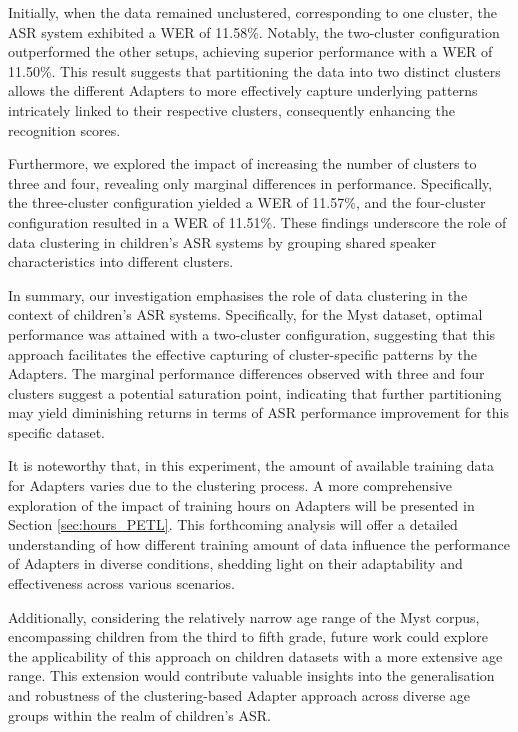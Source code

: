 Initially, when the data remained unclustered, corresponding to one cluster, the \ac{ASR} system exhibited a \ac{WER} of 11.58\%. Notably, the two-cluster configuration outperformed the other setups, achieving superior performance with a \ac{WER} of 11.50\%. This result suggests that partitioning the data into two distinct clusters allows the different Adapters to more effectively capture underlying patterns intricately linked to their respective clusters, consequently enhancing the recognition scores.

Furthermore, we explored the impact of increasing the number of clusters to three and four, revealing only marginal differences in performance. Specifically, the three-cluster configuration yielded a \ac{WER} of 11.57\%, and the four-cluster configuration resulted in a \ac{WER} of 11.51\%. These findings underscore the role of data clustering in children's \ac{ASR} systems by grouping shared speaker characteristics into different clusters.


In summary, our investigation emphasises the role of data clustering in the context of children's \ac{ASR} systems. Specifically, for the Myst dataset, optimal performance was attained with a two-cluster configuration, suggesting that this approach facilitates the effective capturing of cluster-specific patterns by the Adapters. The marginal performance differences observed with three and four clusters suggest a potential saturation point, indicating that further partitioning may yield diminishing returns in terms of \ac{ASR} performance improvement for this specific dataset.

It is noteworthy that, in this experiment, the amount of available training data for Adapters varies due to the clustering process. A more comprehensive exploration of the impact of training hours on Adapters will be presented in Section \ref{sec:hours_PETL}. This forthcoming analysis will offer a detailed understanding of how different training amount of data influence the performance of Adapters in diverse conditions, shedding light on their adaptability and effectiveness across various scenarios.

Additionally, considering the relatively narrow age range of the Myst corpus, encompassing children from the third to fifth grade, future work could explore the applicability of this approach on children datasets with a more extensive age range. This extension would contribute valuable insights into the generalisation and robustness of the clustering-based Adapter approach across diverse age groups within the realm of children's \ac{ASR}.

